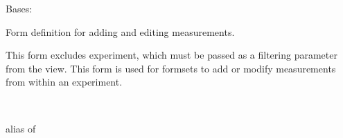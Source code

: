\documentclass[letterpaper,10pt,english]{sphinxmanual}
\begin{document}

\begin{fulllineitems}
\label{api:data.forms.MeasurementForm}
Bases: 

Form definition for adding and editing measurements.

This form excludes experiment, which must be passed as a filtering parameter from the view.  
This form is used for formsets to add or modify measurements from within an experiment.

\begin{fulllineitems}
\label{api:data.forms.MeasurementForm.Meta}~

\begin{fulllineitems}
\label{api:data.forms.MeasurementForm.Meta.model}
alias of 

\end{fulllineitems}


\end{fulllineitems}


\begin{fulllineitems}
\label{api:data.forms.MeasurementForm.media}
\end{fulllineitems}


\end{fulllineitems}

\end{document}
